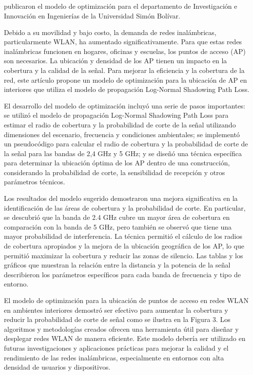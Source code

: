 \subsection{}

\cite{pr_contreras2021modelwlan} publicaron el modelo de optimización   para el departamento de Investigación e Innovación en Ingenierías de la Universidad Simón Bolívar.

Debido a su movilidad y bajo costo, la demanda de redes inalámbricas, particularmente WLAN, ha aumentado significativamente. Para que estas redes inalámbricas funcionen en hogares, oficinas y escuelas, los puntos de acceso (AP) son necesarios. La ubicación y densidad de los AP tienen un impacto en la cobertura y la calidad de la señal. Para mejorar la eficiencia y la cobertura de la red, este artículo propone un modelo de optimización para la ubicación de AP en interiores que utiliza el modelo de propagación Log-Normal Shadowing Path Loss.

El desarrollo del modelo de optimización incluyó una serie de pasos importantes: se utilizó el modelo de propagación Log-Normal Shadowing Path Loss para estimar el radio de cobertura y la probabilidad de corte de la señal utilizando dimensiones del escenario, frecuencia y condiciones ambientales; se implementó un pseudocódigo para calcular el radio de cobertura y la probabilidad de corte de la señal para las bandas de 2,4 GHz y 5 GHz; y se diseñó una técnica específica para determinar la ubicación óptima de los AP dentro de una construcción, considerando la probabilidad de corte, la sensibilidad de recepción y otros parámetros técnicos.

Los resultados del modelo sugerido demostraron una mejora significativa en la identificación de las áreas de cobertura y la probabilidad de corte. En particular, se descubrió que la banda de 2.4 GHz cubre un mayor área de cobertura en comparación con la banda de 5 GHz, pero también se observó que tiene una mayor probabilidad de interferencia. La técnica permitió el cálculo de los radios de cobertura apropiados y la mejora de la ubicación geográfica de los AP, lo que permitió maximizar la cobertura y reducir las zonas de silencio. Las tablas y los gráficos que muestran la relación entre la distancia y la potencia de la señal describieron los parámetros específicos para cada banda de frecuencia y tipo de entorno.

El modelo de optimización para la ubicación de puntos de acceso en redes WLAN en ambientes interiores demostró ser efectivo para aumentar la cobertura y reducir la probabilidad de corte de señal como se ilustra en la Figura 3. Los algoritmos y metodologías creados ofrecen una herramienta útil para diseñar y desplegar redes WLAN de manera eficiente. Este modelo debería ser utilizado en futuras investigaciones y aplicaciones prácticas para mejorar la calidad y el rendimiento de las redes inalámbricas, especialmente en entornos con alta densidad de usuarios y dispositivos.

